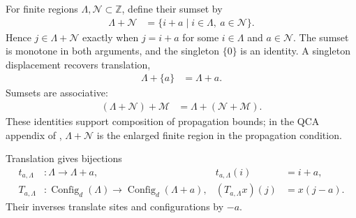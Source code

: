 \begin{definition}
    \label{def:qca_region_sumset}
    \leanok
    For finite regions $\Lambda,\mathcal N\subset\mathbb Z$, define their
    sumset by
    \begin{align}
        \Lambda+\mathcal N
         & =\{i+a\mid i\in\Lambda,\ a\in\mathcal N\}.
    \end{align}
    Hence $j\in\Lambda+\mathcal N$ exactly when $j=i+a$ for some
    $i\in\Lambda$ and $a\in\mathcal N$. The sumset is monotone in both
    arguments, and the singleton $\{0\}$ is an identity. A singleton
    displacement recovers translation,
    \begin{align}
        \Lambda+\{a\} & =\Lambda+a.
    \end{align}
    Sumsets are associative:
    \begin{align}
        (\Lambda+\mathcal N)+\mathcal M & =\Lambda+(\mathcal N+\mathcal M).
    \end{align}
    These identities support composition of propagation bounds; in the QCA appendix of \cite{Cirac2017MPU}, $\Lambda+\mathcal N$ is the
    enlarged finite region in the propagation
    condition.
\end{definition}

\begin{definition}
    \label{def:qca_finite_configuration_translation}
    \leanok
    Translation gives bijections
    \begin{align}
        t_{a,\Lambda} & \colon\Lambda\longrightarrow\Lambda+a,
                      & t_{a,\Lambda}(i)                       & =i+a,    \\
        T_{a,\Lambda} & \colon\operatorname{Config}_d(\Lambda)
        \longrightarrow\operatorname{Config}_d(\Lambda+a),
                      & (T_{a,\Lambda}x)(j)                    & =x(j-a).
    \end{align}
    Their inverses translate sites and configurations by $-a$.
\end{definition}


